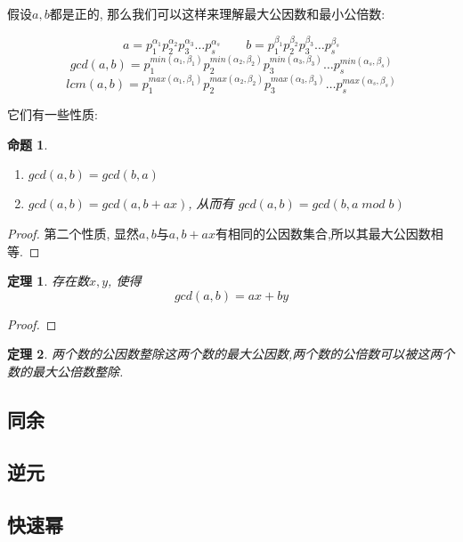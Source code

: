 \documentclass{article}
\newtheorem{theorem}{定理}
\newtheorem{prop}{命题}
\begin{document}
	假设$a, b$都是正的, 那么我们可以这样来理解最大公因数和最小公倍数:
	
	$$ a = p_{1}^{\alpha_1}p_{2}^{\alpha_2}p_{3}^{\alpha_3}\dots p_{s}^{\alpha_s} \quad \quad
		  b = p_{1}^{\beta_1}p_{2}^{\beta_2}p_{3}^{\beta_3}\dots p_{s}^{\beta_s} $$
	$$ gcd(a,b) = p_{1}^{min(\alpha_1,\beta_1)}p_{2}^{min(\alpha_2,\beta_2)}p_{3}^{min(\alpha_3,\beta_3)}\dots p_{s}^{min(\alpha_s,\beta_s)} $$
	$$ lcm(a,b) = p_{1}^{max(\alpha_1,\beta_1)}p_{2}^{max(\alpha_2,\beta_2)}p_{3}^{max(\alpha_3,\beta_3)}\dots p_{s}^{max(\alpha_s,\beta_s)} $$
	
	它们有一些性质:
	
	\begin{prop}
		\begin{enumerate}
				\item $gcd(a,b) = gcd(b,a)$
				\item $gcd(a,b) = gcd(a, b + ax)$, 从而有 $ gcd(a,b) = gcd(b,a \; mod \; b)$
		\end{enumerate}
	\end{prop}
	
	\begin{proof}
		第二个性质, 显然$a, b$与$a, b + ax$有相同的公因数集合,所以其最大公因数相等.
	\end{proof}
	
	\begin{theorem}
		存在数$x, y$, 使得
		$$gcd(a,b) = ax + by$$
	\end{theorem}
	\begin{proof}
		
	\end{proof}
	\begin{theorem}
		两个数的公因数整除这两个数的最大公因数,两个数的公倍数可以被这两个数的最大公倍数整除.
	\end{theorem}
	
	
	
	
	\subsection{同余}
	
	\subsection{逆元}
	
	\subsection{快速幂}
	
\end{document}

